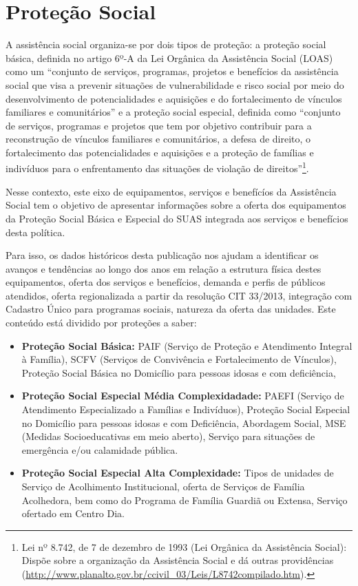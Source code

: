 \documentclass[
  brazilian]{report}
\begin{document}
\hypertarget{proteuxe7uxe3o-social}{%
\section{Proteção Social}\label{proteuxe7uxe3o-social}}

A assistência social organiza-se por dois tipos de proteção: a proteção
social básica, definida no artigo 6º-A da Lei Orgânica da Assistência
Social (LOAS) como um ``conjunto de serviços, programas, projetos e
benefícios da assistência social que visa a prevenir situações de
vulnerabilidade e risco social por meio do desenvolvimento de
potencialidades e aquisições e do fortalecimento de vínculos familiares
e comunitários'' e a proteção social especial, definida como ``conjunto
de serviços, programas e projetos que tem por objetivo contribuir para a
reconstrução de vínculos familiares e comunitários, a defesa de direito,
o fortalecimento das potencialidades e aquisições e a proteção de
famílias e indivíduos para o enfrentamento das situações de violação de
direitos''\footnote{Lei nº 8.742, de 7 de dezembro de 1993 (Lei Orgânica da Assistência Social): Dispõe sobre a organização da Assistência Social e dá outras providências (\url{http://www.planalto.gov.br/ccivil_03/Leis/L8742compilado.htm}).}.

Nesse contexto, este eixo de equipamentos, serviços e benefícíos da
Assistência Social tem o objetivo de apresentar informações sobre a
oferta dos equipamentos da Proteção Social Básica e Especial do SUAS
integrada aos serviços e benefícios desta política.

Para isso, os dados históricos desta publicação nos ajudam a identificar
os avanços e tendências ao longo dos anos em relação a estrutura física
destes equipamentos, oferta dos serviços e benefícios, demanda e perfis
de públicos atendidos, oferta regionalizada a partir da resolução CIT
33/2013, integração com Cadastro Único para programas sociais, natureza
da oferta das unidades. Este conteúdo está dividido por proteções a
saber:

\begin{itemize}
\item
  \textbf{Proteção Social Básica:} PAIF (Serviço de Proteção e
  Atendimento Integral à Família), SCFV (Serviços de Convivência e
  Fortalecimento de Vínculos), Proteção Social Básica no Domicílio para
  pessoas idosas e com deficiência,
\item
  \textbf{Proteção Social Especial Média Complexidadade:} PAEFI (Serviço
  de Atendimento Especializado a Famílias e Indivíduos), Proteção Social
  Especial no Domicílio para pessoas idosas e com Deficiência, Abordagem
  Social, MSE (Medidas Socioeducativas em meio aberto), Serviço para
  situações de emergência e/ou calamidade pública.
\item
  \textbf{Proteção Social Especial Alta Complexidade:} Tipos de unidades
  de Serviço de Acolhimento Institucional, oferta de Serviços de Família
  Acolhedora, bem como do Programa de Família Guardiã ou Extensa,
  Serviço ofertado em Centro Dia.
\end{itemize}
\end{document}
